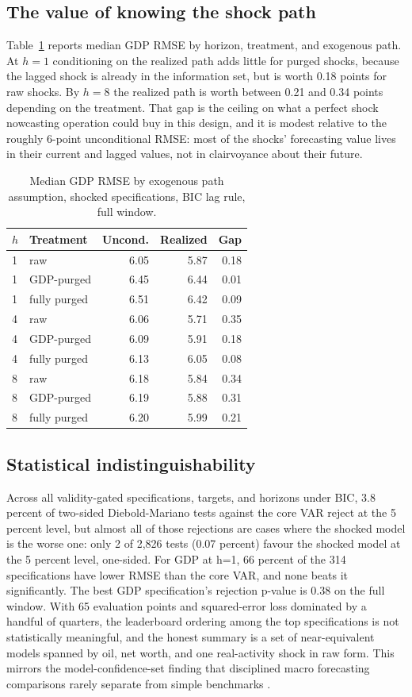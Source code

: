 \documentclass[conference]{IEEEtran}
\begin{document}
\subsection{The value of knowing the shock path}
Table~\ref{tab:path} reports median GDP RMSE by horizon, treatment, and exogenous path. At $h=1$ conditioning on the realized path adds little for purged shocks, because the lagged shock is already in the information set, but is worth 0.18 points for raw shocks. By $h=8$ the realized path is worth between 0.21 and 0.34 points depending on the treatment. That gap is the ceiling on what a perfect shock nowcasting operation could buy in this design, and it is modest relative to the roughly 6-point unconditional RMSE: most of the shocks' forecasting value lives in their current and lagged values, not in clairvoyance about their future.

\begin{table}[t]
\caption{Median GDP RMSE by exogenous path assumption, shocked specifications, BIC lag rule, full window.}
\label{tab:path}
\centering
\small
\begin{tabular}{@{}llrrr@{}}
\toprule
$h$ & Treatment & Uncond. & Realized & Gap \\
\midrule
1 & raw & 6.05 & 5.87 & 0.18 \\
1 & GDP-purged & 6.45 & 6.44 & 0.01 \\
1 & fully purged & 6.51 & 6.42 & 0.09 \\
4 & raw & 6.06 & 5.71 & 0.35 \\
4 & GDP-purged & 6.09 & 5.91 & 0.18 \\
4 & fully purged & 6.13 & 6.05 & 0.08 \\
8 & raw & 6.18 & 5.84 & 0.34 \\
8 & GDP-purged & 6.19 & 5.88 & 0.31 \\
8 & fully purged & 6.20 & 5.99 & 0.21 \\
\bottomrule
\end{tabular}
\end{table}

\subsection{Statistical indistinguishability}
Across all validity-gated specifications, targets, and horizons under BIC, 3.8 percent of two-sided Diebold-Mariano tests against the core VAR reject at the 5 percent level, but almost all of those rejections are cases where the shocked model is the worse one: only 2 of 2,826 tests (0.07 percent) favour the shocked model at the 5 percent level, one-sided. For GDP at h=1, 66 percent of the 314 specifications have lower RMSE than the core VAR, and none beats it significantly. The best GDP specification's rejection p-value is 0.38 on the full window. With 65 evaluation points and squared-error loss dominated by a handful of quarters, the leaderboard ordering among the top specifications is not statistically meaningful, and the honest summary is a set of near-equivalent models spanned by oil, net worth, and one real-activity shock in raw form. This mirrors the model-confidence-set finding that disciplined macro forecasting comparisons rarely separate from simple benchmarks \cite{hln2011}.
\end{document}
